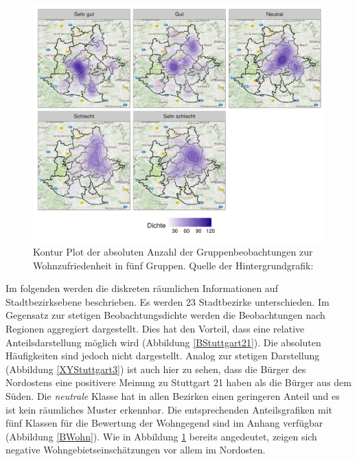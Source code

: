 \documentclass{Vorlage}
\begin{document}
\begin{figure}[h]
 \begin{center}
 \includegraphics[scale=0.8]{Pictures/XYWohnG5.png}
 \caption{Kontur Plot der absoluten Anzahl der Gruppenbeobachtungen zur Wohnzufriedenheit in fünf Gruppen. Quelle der Hintergrundgrafik: \cite{google}}
 \label{XYWohnG5}
 \end{center}
\end{figure}


Im folgenden werden die diskreten räumlichen Informationen auf Stadtbezirksebene beschrieben. Es werden 23 Stadtbezirke 
unterschieden. Im Gegensatz zur stetigen Beobachtungsdichte werden die Beobachtungen nach Regionen aggregiert 
dargestellt. Dies hat den Vorteil, dass eine relative Anteilsdarstellung möglich wird (Abbildung 
\ref{BStuttgart21}). Die absoluten Häufigkeiten sind jedoch nicht dargestellt. Analog zur stetigen Darstellung 
(Abbildung \ref{XYStuttgart3}) ist auch hier zu sehen, dass die Bürger des Nordostens eine positivere Meinung zu 
Stuttgart 21 haben als die Bürger aus dem Süden. Die \textit{neutrale} Klasse hat in allen Bezirken einen geringeren 
Anteil und es ist kein räumliches Muster erkennbar. Die entsprechenden Anteilsgrafiken mit fünf Klassen für die 
Bewertung der Wohngegend sind im Anhang verfügbar (Abbildung \ref{BWohn}). Wie in Abbildung \ref{XYWohnG5} bereits 
angedeutet, zeigen sich negative Wohngebietseinschätzungen vor allem im Nordosten.
\end{document}
